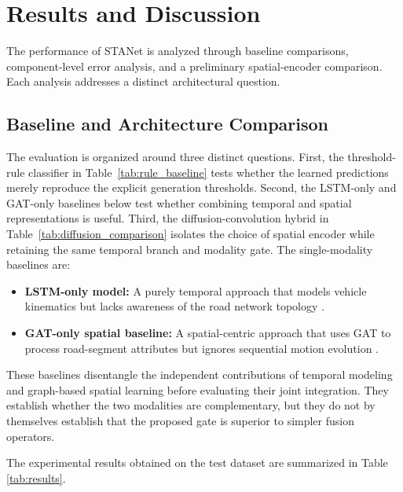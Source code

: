 \documentclass[journal]{IEEEtran}
\begin{document}
\section{Results and Discussion}

The performance of STANet is analyzed through baseline comparisons, component-level error analysis, and a preliminary spatial-encoder comparison. Each analysis addresses a distinct architectural question.

\subsection{Baseline and Architecture Comparison}
The evaluation is organized around three distinct questions. First, the threshold-rule classifier in Table~\ref{tab:rule_baseline} tests whether the learned predictions merely reproduce the explicit generation thresholds. Second, the LSTM-only and GAT-only baselines below test whether combining temporal and spatial representations is useful. Third, the diffusion-convolution hybrid in Table~\ref{tab:diffusion_comparison} isolates the choice of spatial encoder while retaining the same temporal branch and modality gate. The single-modality baselines are:
\begin{itemize}
  \item \textbf{LSTM-only model:} A purely temporal approach that models vehicle kinematics but lacks awareness of the road network topology \cite{zhou_hybrid_2022, taheri_sarteshnizi_applicability_2026}.
  \item \textbf{GAT-only spatial baseline:} A spatial-centric approach that uses GAT to process road-segment attributes but ignores sequential motion evolution \cite{zhang_automatic_2022, li_graph_2023}.
\end{itemize}
These baselines disentangle the independent contributions of temporal modeling and graph-based spatial learning before evaluating their joint integration. They establish whether the two modalities are complementary, but they do not by themselves establish that the proposed gate is superior to simpler fusion operators.

The experimental results obtained on the test dataset are summarized in Table \ref{tab:results}.
\end{document}
